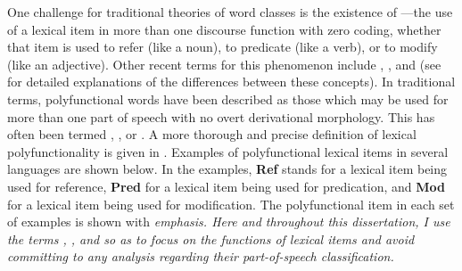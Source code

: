 One challenge for traditional theories of word classes is the existence of —the use of a lexical item in more than one discourse function with zero coding, whether that item is used to refer (like a noun), to predicate (like a verb), or to modify (like an adjective). Other recent terms for this phenomenon include , , and  (see  for detailed explanations of the differences between these concepts). In traditional terms, polyfunctional words have been described as those which may be used for more than one part of speech with no overt derivational morphology. This has often been termed , , or . A more thorough and precise definition of lexical polyfunctionality is given in . Examples of polyfunctional lexical items in several languages are shown below. In the examples, \textbf{Ref} stands for a lexical item being used for reference, \textbf{Pred} for a lexical item being used for predication, and \textbf{Mod} for a lexical item being used for modification. The polyfunctional item in each set of examples is shown with \em{emphasis}. Here and throughout this dissertation, I use the terms , , and  so as to focus on the functions of lexical items and avoid committing to any analysis regarding their part-of-speech classification.

